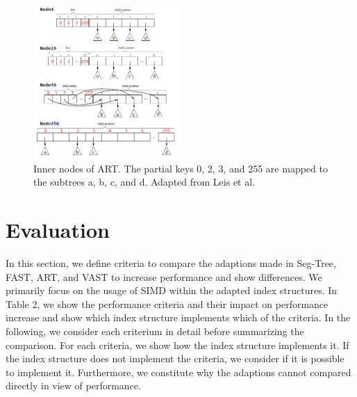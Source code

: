 \documentclass[conference]{IEEEtran}
\begin{document}
\begin{figure}
	\includegraphics[width=0.5\textwidth]{figure_4.png}
	\caption{Inner nodes of ART. The partial keys 0, 2, 3, and 255 are mapped to the subtrees a, b, c, and d. Adapted from Leis et al. \cite{b4}}
	\label{fig}
\end{figure}


\section{Evaluation}
In this section, we define criteria to compare the adaptions made in Seg-Tree, FAST, ART, and VAST to increase performance and show differences. We primarily focus on the usage of SIMD within the adapted index structures. %
In Table 2, we show the performance criteria and their impact on performance increase and show which index structure implements which of the criteria. In the following, we consider each criterium in detail before summarizing the comparison. For each criteria, we show how the index structure implements it. If the index structure does not implement the criteria, we consider if it is possible to implement it. Furthermore, we constitute why the adaptions cannot compared directly in view of performance.
\end{document}
